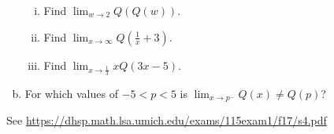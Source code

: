 \documentclass[11pt]{exam}
\begin{document}
\begin{questions}
\begin{enumerate}[(a)]
\begin{enumerate}[(i)]
\item Find $\displaystyle\lim_{w \rightarrow 2} Q(Q(w))$.

\item Find $\displaystyle\lim_{x \rightarrow \infty} Q \left( \frac{1}{x} + 3 \right)$.

\item Find $\displaystyle\lim_{x \rightarrow \frac{1}{3}} x Q \left( 3x-5 \right)$.
\end{enumerate}
\item For which values of $-5<p<5$ is $\displaystyle\lim_{x \rightarrow p^-} Q \left( x \right) \neq Q(p)$?
\end{enumerate}
\begin{solution}
  See \href{https://dhsp.math.lsa.umich.edu/exams/115exam1/f17/s4.pdf}{https://dhsp.math.lsa.umich.edu/exams/115exam1/f17/s4.pdf}
\end{solution}
\end{questions}
\end{document}
